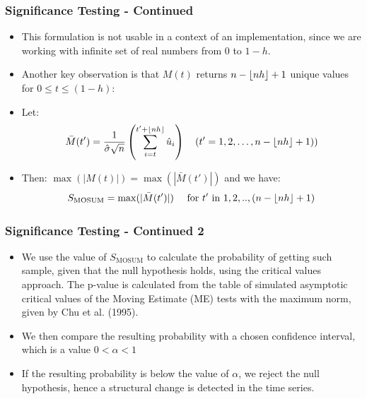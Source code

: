 \documentclass[9pt]{beamer}
\DeclarePairedDelimiter\floor{\lfloor}{\rfloor}
\begin{document}
\begin{frame}
  \frametitle{Significance Testing - Continued}
  \begin{itemize}
  \item This formulation is not usable in a context of an implementation, since we are working
    with infinite set of real numbers from $0$ to $1-h$.
  \item Another key observation is that $M(t)$ returns $n - \floor{nh} + 1$ unique values for $0 \leq t \leq (1-h)$:
  \item Let:
    \begin{equation} \label{eq:mosum}
      \bar{M}(t') =
      \frac{1}{\hat{\sigma} \sqrt{n}}
      \left(\sum_{i=t}^{t' + \floor{nh}} \hat{u}_i\right)
      \quad(t' = 1,2, \hdots, n - \floor{nh} + 1))
    \end{equation}
  \item Then: 
    $\max(|M(t)|) = \max(|\bar{M}(t')|)$ and we have:
    \begin{equation} \label{eq:test_statistic}
      S_{\text{MOSUM}} = \max(|\bar{M}(t')|) \quad \text{ for } t' \text{ in } 1,2,..,(n - \floor{nh} + 1)
    \end{equation}
  \end{itemize}
\end{frame}

\begin{frame}
  \frametitle{Significance Testing - Continued 2}
  \begin{itemize}
  \item We use the value of $S_{\text{MOSUM}}$ to calculate the probability of getting such
    sample, given that the null hypothesis holds, using the critical values approach.
    The p-value is calculated from the table of
    simulated asymptotic critical values of the Moving Estimate (ME) tests with
    the maximum norm, given by Chu et al. (1995).
  \item  We then compare the resulting
    probability with a chosen confidence interval, which is a value $0 < \alpha < 1$
    \item If the resulting probability is below the
      value of $\alpha$, we reject the null hypothesis, hence a 
      structural change is detected in the time series. 
  \end{itemize}
\end{frame}
\end{document}
